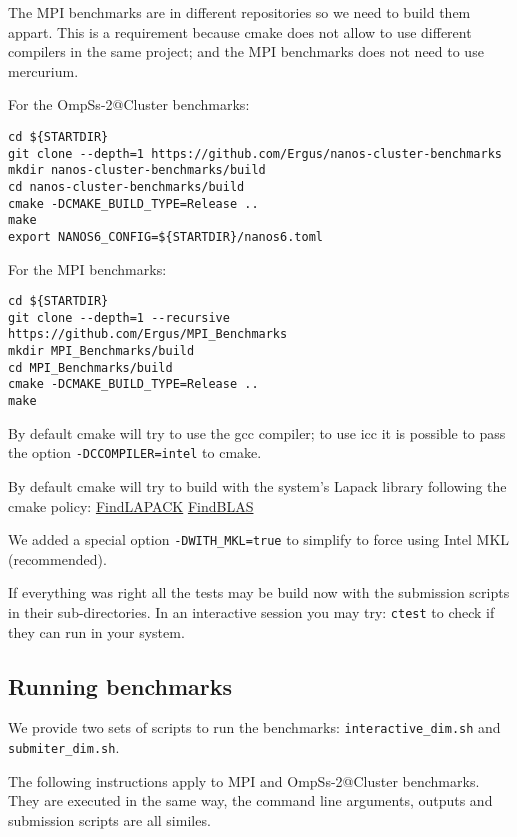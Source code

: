 \documentclass{article}
\newcommand{\code}[1]{\texttt{#1}}
\begin{document}
The MPI benchmarks are in different repositories so we need to build
them appart. This is a requirement because cmake does not allow to use
different compilers in the same project; and the MPI benchmarks does
not need to use mercurium.

For the OmpSs-2@Cluster benchmarks:

\begin{lstlisting}
cd ${STARTDIR}
git clone --depth=1 https://github.com/Ergus/nanos-cluster-benchmarks
mkdir nanos-cluster-benchmarks/build
cd nanos-cluster-benchmarks/build
cmake -DCMAKE_BUILD_TYPE=Release ..
make
export NANOS6_CONFIG=${STARTDIR}/nanos6.toml
\end{lstlisting}

For the MPI benchmarks:

\begin{lstlisting}
cd ${STARTDIR}
git clone --depth=1 --recursive https://github.com/Ergus/MPI_Benchmarks
mkdir MPI_Benchmarks/build
cd MPI_Benchmarks/build
cmake -DCMAKE_BUILD_TYPE=Release ..
make
\end{lstlisting}

By default cmake will try to use the gcc compiler; to use icc it is
possible to pass the option \code{-DCCOMPILER=intel} to cmake.

By default cmake will try to build with the system's Lapack library
following the cmake policy:
\href{https://cmake.org/cmake/help/latest/module/FindLAPACK.html}{FindLAPACK}
\href{https://cmake.org/cmake/help/latest/module/FindBLAS.html}{FindBLAS}

We added a special option \code{-DWITH\_MKL=true} to simplify to force
using Intel MKL (recommended).

If everything was right all the tests may be build now with the
submission scripts in their sub-directories. In an interactive session
you may try: \code{ctest} to check if they can run in your system.

\subsection{Running benchmarks}

We provide two sets of scripts to run the benchmarks:
\code{interactive\_dim.sh} and \code{submiter\_dim.sh}.

The following instructions apply to MPI and OmpSs-2@Cluster
benchmarks.  They are executed in the same way, the command line
arguments, outputs and submission scripts are all similes.
\end{document}
